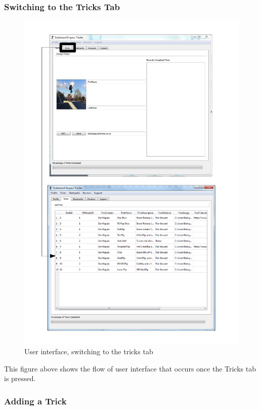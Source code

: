 \subsubsection{Switching to the Tricks Tab}

\begin{figure}[H]
    \includegraphics[width=\textwidth]{./Maintenance/Figures/TricksTab.pdf}
    \caption{User interface, switching to the tricks tab} \label{fig:Trick Tab UI}
\end{figure}

This figure above shows the flow of user interface that occurs once the Tricks tab is pressed.

\subsubsection{Adding a Trick}

